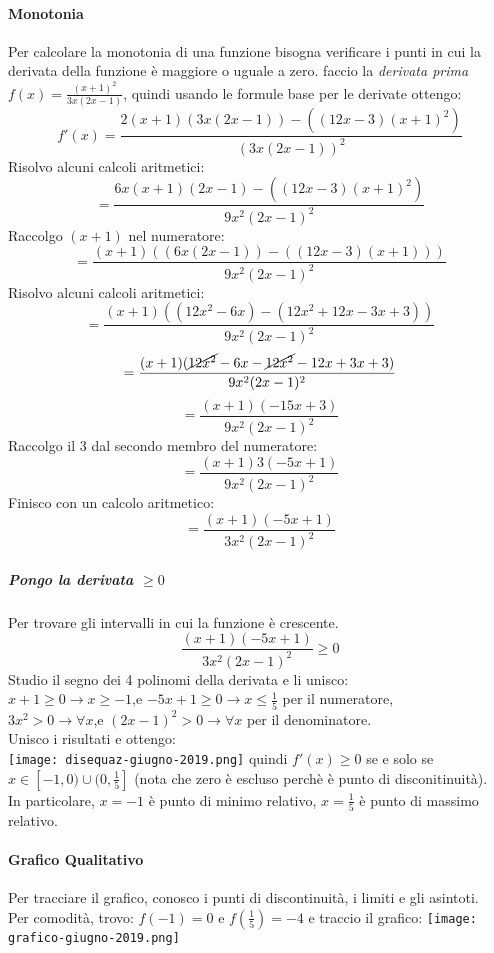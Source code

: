 \documentclass[12pt, a4paper, openany]{book}
\begin{document}
{	\paragraph*{Monotonia}
	Per calcolare la monotonia di una funzione bisogna verificare i punti in cui la derivata della funzione è maggiore o uguale a zero.
	faccio la \emph{derivata prima}
	$f(x) = \frac{(x+1)^2}{3x(2x-1)}$, quindi usando le formule base per le derivate ottengo:
	$$
		f'(x) = \frac{2(x+1)(3x(2x-1))-((12x-3)(x+1)^2)}{(3x(2x-1))^2}
	$$
	Risolvo alcuni calcoli aritmetici:
	$$
		= \frac{6x(x+1)(2x-1)-((12x-3)(x+1)^2)}{9x^2(2x-1)^2}
	$$
	Raccolgo $(x+1)$ nel numeratore:
	$$
		= \frac{(x+1)((6x(2x-1))-((12x-3)(x+1)))}{9x^2(2x-1)^2}
	$$
	Risolvo alcuni calcoli aritmetici:
	$$
		= \frac{(x+1)((12x^2-6x)-(12x^2+12x-3x+3))}{9x^2(2x-1)^2}
	$$
	$$
		=\frac{(x+1)(\cancel{12x^2}-6x-\cancel{12x^2}-12x+3x+3)}{9x^2(2x-1)^2}
	$$
	$$
		=\frac{(x+1)(-15x+3)}{9x^2(2x-1)^2}
	$$
	Raccolgo il 3 dal secondo membro del numeratore:
	$$
		=\frac{(x+1)3(-5x+1)}{9x^2(2x-1)^2}
	$$
	Finisco con un calcolo aritmetico:
	$$
		=\frac{(x+1)(-5x+1)}{3x^2(2x-1)^2}
	$$
	\subparagraph*{Pongo la derivata $\geq 0$}
	Per trovare gli intervalli in cui la funzione è crescente.
	$$
		\frac{(x+1)(-5x+1)}{3x^2(2x-1)^2} \geq 0
	$$
	Studio il segno dei 4 polinomi della derivata e li unisco:
	\\$x+1\geq 0 \to x\geq -1$,e $-5x+1\geq 0 \to x\leq \frac{1}{5}$ per il numeratore,
		\\ $3x^2>0 \to \forall x$,e $(2x-1)^2>0 \to \forall x$ per il denominatore.
		\\Unisco i risultati e ottengo:
		\\\texttt{[image: disequaz-giugno-2019.png]}
		quindi $f'(x)\geq 0$ se e solo se $x\in [-1,0)\cup (0,\frac{1}{5}]$ (nota che zero è escluso perchè è punto di disconitinuità).
		\\In particolare, $x=-1$ è punto di minimo relativo, $x=\frac{1}{5}$ è punto di massimo relativo.

		\paragraph*{Grafico Qualitativo}
		Per tracciare il grafico, conosco i punti di discontinuità, i limiti e gli asintoti.
		\\Per comodità, trovo: $f(-1)=0$ e $f(\frac{1}{5})=-4$ e traccio il grafico:
	\texttt{[image: grafico-giugno-2019.png]}
}
\end{document}
